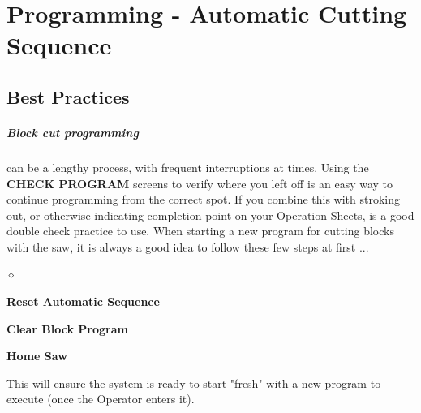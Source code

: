 \chapter{Programming - Automatic Cutting Sequence}
\section{Best Practices}\paragraph*{Block cut programming}can be a lengthy process, with frequent interruptions at times. Using the \textbf{CHECK PROGRAM} screens to verify where you left off is an easy way to continue programming from the correct spot. If you combine this with stroking out, or otherwise indicating completion point on your Operation Sheets, is a good double check practice to use. When starting a new program for cutting blocks with the saw, it is always a good idea to follow these few steps at first ...
\begin{list}{$\diamond$}{}
	\item \textbf{Reset Automatic Sequence}
	\item \textbf{Clear Block Program}
	\item \textbf{Home Saw}
\end{list}
This will ensure the system is ready to start "fresh" with a new program to execute (once the Operator enters it). 
